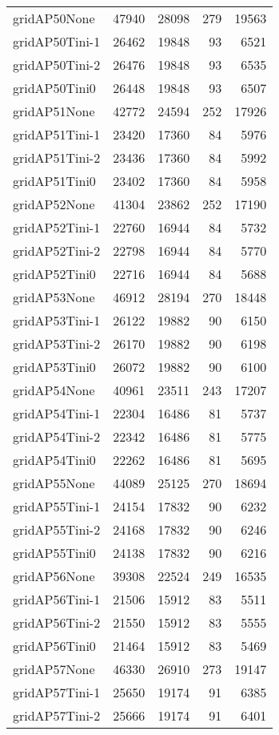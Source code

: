 \begin{longtable}{lrrrr}
gridAP50None & 47940 & 28098 & 279 & 19563 \\
gridAP50Tini-1 & 26462 & 19848 & 93 & 6521 \\
gridAP50Tini-2 & 26476 & 19848 & 93 & 6535 \\
gridAP50Tini0 & 26448 & 19848 & 93 & 6507 \\
gridAP51None & 42772 & 24594 & 252 & 17926 \\
gridAP51Tini-1 & 23420 & 17360 & 84 & 5976 \\
gridAP51Tini-2 & 23436 & 17360 & 84 & 5992 \\
gridAP51Tini0 & 23402 & 17360 & 84 & 5958 \\
gridAP52None & 41304 & 23862 & 252 & 17190 \\
gridAP52Tini-1 & 22760 & 16944 & 84 & 5732 \\
gridAP52Tini-2 & 22798 & 16944 & 84 & 5770 \\
gridAP52Tini0 & 22716 & 16944 & 84 & 5688 \\
gridAP53None & 46912 & 28194 & 270 & 18448 \\
gridAP53Tini-1 & 26122 & 19882 & 90 & 6150 \\
gridAP53Tini-2 & 26170 & 19882 & 90 & 6198 \\
gridAP53Tini0 & 26072 & 19882 & 90 & 6100 \\
gridAP54None & 40961 & 23511 & 243 & 17207 \\
gridAP54Tini-1 & 22304 & 16486 & 81 & 5737 \\
gridAP54Tini-2 & 22342 & 16486 & 81 & 5775 \\
gridAP54Tini0 & 22262 & 16486 & 81 & 5695 \\
gridAP55None & 44089 & 25125 & 270 & 18694 \\
gridAP55Tini-1 & 24154 & 17832 & 90 & 6232 \\
gridAP55Tini-2 & 24168 & 17832 & 90 & 6246 \\
gridAP55Tini0 & 24138 & 17832 & 90 & 6216 \\
gridAP56None & 39308 & 22524 & 249 & 16535 \\
gridAP56Tini-1 & 21506 & 15912 & 83 & 5511 \\
gridAP56Tini-2 & 21550 & 15912 & 83 & 5555 \\
gridAP56Tini0 & 21464 & 15912 & 83 & 5469 \\
gridAP57None & 46330 & 26910 & 273 & 19147 \\
gridAP57Tini-1 & 25650 & 19174 & 91 & 6385 \\
gridAP57Tini-2 & 25666 & 19174 & 91 & 6401 \\

\end{longtable}
